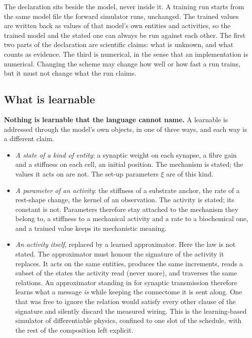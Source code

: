 \documentclass[11pt]{article}
\begin{document}
The declaration sits beside the model, never inside it. A training run starts from the
same model file the forward simulator runs, unchanged. The trained values are written
back as values of that model's own entities and activities, so the trained model and the
stated one can always be run against each other. The first two parts of the declaration
are scientific claims: what is unknown, and what counts as evidence. The third is
numerical, in the sense that an implementation is numerical. Changing the scheme may change
how well or how fast a run trains, but it must not change what the run claims.

\subsection{What is learnable}

\textbf{Nothing is learnable that the language cannot name.} A learnable is addressed
through the model's own objects, in one of three ways, and each way is a different claim.

\begin{itemize}
\item \emph{A state of a kind of entity}: a synaptic weight on each synapse, a fibre gain
and a stiffness on each cell, an initial position. The mechanism is stated; the values it
acts on are not. The set-up parameters $\xi$ are of this kind.
\item \emph{A parameter of an activity}: the stiffness of a substrate anchor, the rate of
a rest-shape change, the kernel of an observation. The activity is stated; its constant
is not. Parameters therefore stay attached to the mechanism they belong to, a stiffness to
a mechanical activity and a rate to a biochemical one, and a trained value keeps its
mechanistic meaning.
\item \emph{An activity itself}, replaced by a learned approximator. Here the law is not
stated. The approximator must honour the signature of the activity it replaces. It acts
on the same entities, produces the same increments, reads a subset of the states the
activity read (never more), and traverses the same relations. An approximator standing
in for synaptic transmission therefore learns what a message \emph{is} while keeping the
connectome it is sent along. One that was free to ignore the relation would satisfy every
other clause of the signature and silently discard the measured wiring. This is the
learning-based simulator of differentiable physics, confined to one slot of the schedule,
with the rest of the composition left explicit.
\end{itemize}
\end{document}
